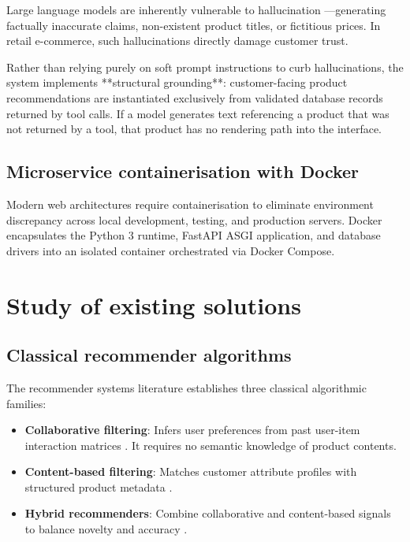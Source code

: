 Large language models are inherently vulnerable to hallucination \cite{ji2023survey}---generating factually inaccurate claims, non-existent product titles, or fictitious prices. In retail e-commerce, such hallucinations directly damage customer trust. 

Rather than relying purely on soft prompt instructions to curb hallucinations, the system implements **structural grounding**: customer-facing product recommendations are instantiated exclusively from validated database records returned by tool calls. If a model generates text referencing a product that was not returned by a tool, that product has no rendering path into the interface.

\subsection{Microservice containerisation with Docker}

Modern web architectures require containerisation to eliminate environment discrepancy across local development, testing, and production servers. Docker encapsulates the Python 3 runtime, FastAPI ASGI application, and database drivers into an isolated container orchestrated via Docker Compose.

\section{Study of existing solutions}

\subsection{Classical recommender algorithms}

The recommender systems literature \cite{ricci2015handbook, resnick1997} establishes three classical algorithmic families:
\begin{itemize}
  \item \textbf{Collaborative filtering}: Infers user preferences from past user-item interaction matrices \cite{sarwar2001}. It requires no semantic knowledge of product contents.
  \item \textbf{Content-based filtering}: Matches customer attribute profiles with structured product metadata \cite{lops2011}.
  \item \textbf{Hybrid recommenders}: Combine collaborative and content-based signals to balance novelty and accuracy \cite{burke2002}.
\end{itemize}

